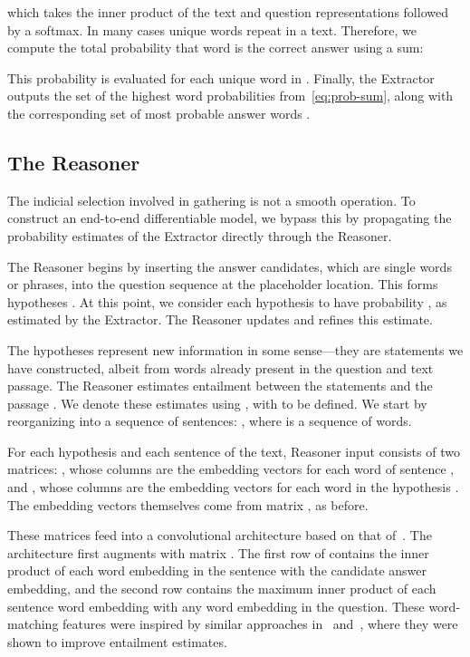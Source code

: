 \documentclass[11pt,letterpaper]{article}
\begin{document}
which takes the inner product of the text and question representations followed by a softmax. In many cases unique words repeat in a text. Therefore, we compute the total probability that word  is the correct answer using a sum:

This probability is evaluated for each unique word in . Finally, the Extractor outputs the set  of the  highest word probabilities from~\ref{eq:prob-sum}, along with the corresponding set of  most probable answer words .

\subsection{The Reasoner}
\label{sec:reasoner}
The indicial selection involved in gathering  is not a smooth operation. To construct an end-to-end differentiable model, we bypass this by propagating the probability estimates of the Extractor directly through the Reasoner.

The Reasoner begins by inserting the answer candidates, which are single words or phrases, into the question sequence  at the placeholder location. This forms  hypotheses . At this point, we consider each hypothesis to have probability , as estimated by the Extractor. The Reasoner updates and refines this estimate.

The hypotheses represent new information in some sense---they are statements we have constructed, albeit from words already present in the question and text passage. The Reasoner estimates entailment between the statements  and the passage . We denote these estimates using , with  to be defined. We start by reorganizing  into a sequence of  sentences: , where  is a sequence of words.

For each hypothesis and each sentence of the text, Reasoner input consists of two matrices: , whose columns are the embedding vectors for each word of sentence , and , whose columns are the embedding vectors for each word in the hypothesis . The embedding vectors themselves come from matrix , as before.

These matrices feed into a convolutional architecture based on that of~. The architecture first augments  with matrix . The first row of  contains the inner product of each word embedding in the sentence with the candidate answer embedding, and the second row contains the maximum inner product of each sentence word embedding with any word embedding in the question. These word-matching features were inspired by similar approaches in~ and~, where they were shown to improve entailment estimates.
\end{document}

